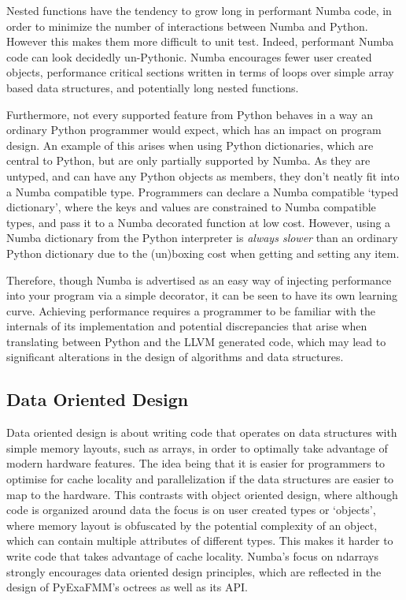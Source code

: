 Nested functions have the tendency to grow long in performant Numba code, in order to minimize the number of interactions between Numba and Python. However this makes them more difficult to unit test. Indeed, performant Numba code can look decidedly un-Pythonic. Numba encourages fewer user created objects, performance critical sections written in terms of loops over simple array based data structures, and potentially long nested functions. 

Furthermore, not every supported feature from Python behaves in a way an ordinary Python programmer would expect, which has an impact on program design. An example of this arises when using Python dictionaries, which are central to Python, but are only partially supported by Numba. As they are untyped, and can have any Python objects as members, they don't neatly fit into a Numba compatible type. Programmers can declare a Numba compatible `typed dictionary', where the keys and values are constrained to Numba compatible types, and pass it to a Numba decorated function at low cost. However, using a Numba dictionary from the Python interpreter is \textit{always slower} than an ordinary Python dictionary due to the (un)boxing cost when getting and setting any item.

Therefore, though Numba is advertised as an easy way of injecting performance into your program via a simple decorator, it can be seen to have its own learning curve. Achieving performance requires a programmer to be familiar with the internals of its implementation and potential discrepancies that arise when translating between Python and the LLVM generated code, which may lead to significant alterations in the design of algorithms and data structures.

\subsection*{Data Oriented Design}

Data oriented design is about writing code that operates on data structures with simple memory layouts, such as arrays, in order to optimally take advantage of modern hardware features. The idea being that it is easier for programmers to optimise for cache locality and parallelization if the data structures are easier to map to the hardware. This contrasts with object oriented design, where although code is organized around data the focus is on user created types or `objects', where memory layout is obfuscated by the potential complexity of an object, which can contain multiple attributes of different types. This makes it harder to write code that takes advantage of cache locality. Numba's focus on ndarrays strongly encourages data oriented design principles, which are reflected in the design of PyExaFMM's octrees as well as its API.

